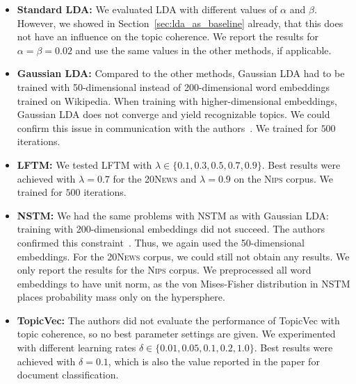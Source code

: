 \documentclass[
        a4paper,
        titlepage,
        twoside,
        parskip,
        numbers=noenddot
        ]{scrbook}
\theoremstyle{break}
\begin{document}
\begin{itemize}
  \item
    \textbf{Standard LDA:}
    We evaluated LDA with different values of $\alpha$ and $\beta$.
    However, we showed in Section~\ref{sec:lda_as_baseline} already, that this does not have an influence on the topic coherence.
    We report the results for $\alpha = \beta = 0.02$ and use the same values in the other methods, if applicable.
  \item
    \textbf{Gaussian LDA:}
    Compared to the other methods, Gaussian LDA had to be trained with 50-dimensional instead of 200-dimensional word embeddings trained on Wikipedia.
    When training with higher-dimensional embeddings, Gaussian LDA does not converge and yield recognizable topics.
    We could confirm this issue in communication with the authors~\cite{Das2016}.
    We trained for $500$ iterations.
  \item
    \textbf{LFTM:}
    We tested LFTM with $\lambda \in \{0.1, 0.3, 0.5, 0.7, 0.9 \}$.
    Best results were achieved with $\lambda = 0.7$ for the \textsc{20News} and $\lambda = 0.9$ on the \textsc{Nips} corpus.
    We trained for $500$ iterations.
  \item
    \textbf{NSTM:}
    We had the same problems with NSTM as with Gaussian LDA: training with 200-dimensional embeddings did not succeed.
    The authors confirmed this constraint~\cite{Saeedi2016}.
    Thus, we again used the 50-dimensional embeddings.
    For the \textsc{20News} corpus, we could still not obtain any results.
    We only report the results for the \textsc{Nips} corpus.
    We preprocessed all word embeddings to have unit norm, as the von Mises-Fisher distribution in NSTM places probability mass only on the hypersphere.
  \item
    \textbf{TopicVec:}
    The authors did not evaluate the performance of TopicVec with topic coherence, so no best parameter settings are given.
    We experimented with different learning rates $\delta \in \{ 0.01, 0.05, 0.1, 0.2, 1.0 \}$.
    Best results were achieved with $\delta = 0.1$, which is also the value reported in the paper for document classification.

\end{itemize}
\end{document}
